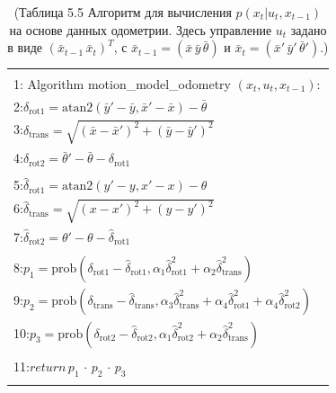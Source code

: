 \documentclass[10pt,a4paper]{article}
\begin{document}
\begin{table}[H]
\begin{center}
\begin{tabular}{|l|}
\hline
{}\\
1: \hspace{3mm} Algorithm motion\_model\_odometry $(x_t,u_t,x_{t-1}):$ \\
2:\hspace{7mm}$\delta_{\text{rot}1}=\text{atan}2(\bar{y}'-\bar{y},\bar{x}'-\bar{x})-\bar{\theta}$\\
3:\hspace{7mm}$\delta_{\text{trans}}=\sqrt{(\bar{x}-\bar{x}')^2+(\bar{y}-\bar{y}')^2}$\\
4:\hspace{7mm}$\delta_{\text{rot}2}=\bar{\theta}'-\bar{\theta}-\delta_{\text{rot}1}$\\
{}\\
5:\hspace{7mm}$\hat{\delta}_{\text{rot}1}=\text{atan}2(y'-y,x'-x)-\theta$\\
6:\hspace{7mm}$\hat{\delta}_{\text{trans}}=\sqrt{(x-x')^2+(y-y')^2}$\\
7:\hspace{7mm}$\hat{\delta}_{\text{rot}2}=\theta'-\theta-\hat{\delta}_{\text{rot}1}$\\
{}\\
8:\hspace{7mm}$p_1=\text{prob}(\delta_{\text{rot}1}-\hat{\delta}_{\text{rot}1},\alpha_1\hat{\delta}_{\text{rot}1}^2+\alpha_2\hat{\delta}_{\text{trans}}^2)$\\
9:\hspace{7mm}$p_2=\text{prob}(\delta_{\text{trans}}-\hat{\delta}_{\text{trans}},\alpha_3\hat{\delta}_{\text{trans}}^2+\alpha_4\hat{\delta}_{\text{rot}1}^2+\alpha_4\hat{\delta}_{\text{rot}2}^2)$\\
10:\hspace{5mm}$p_3=\text{prob}(\delta_{\text{rot}2}-\hat{\delta}_{\text{rot}2},\alpha_1\hat{\delta}_{\text{rot}2}^2+\alpha_2\hat{\delta}_{\text{trans}}^2)$\\
{}\\
11:\hspace{5mm}$\textit{return}\, p_1\,\cdot\,p_2\,\cdot\,p_3$\\
{}\\
\hline
\end{tabular}
\caption{(Таблица 5.5 Алгоритм для вычисления $p(x_t | u_t, x_{t-1})$ на основе данных одометрии.
Здесь управление $u_t$  задано в виде $(\bar{x}_{t-1}\,\bar{x}_t)^T$, с $\bar{x}_{t-1}=(\bar{x}\,\bar{y}\,\bar{\theta})$ и $\bar{x}_t=(\bar{x}'\,\bar{y}'\,\bar{\theta}')$.)}
\end{center}
\end{table}
\end{document}
